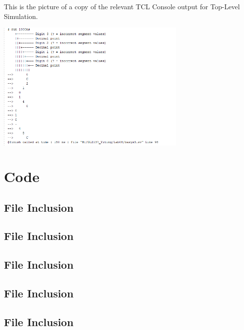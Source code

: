 \documentclass[11pt]{article}
\newcommand{\Verilog}[2][]{%
	
}
\begin{document}
    This is the picture of a copy of the relevant TCL Console output for Top-Level Simulation.
    \begin{center}
        \includegraphics[width=0.7\textwidth]{Top_Level_Simulation}
    \end{center}



\section*{Code}

    \subsection*{File Inclusion}
    \Verilog[caption=mux2 Verilog code,label=code:file_ex]{mux2.sv}

    \subsection*{File Inclusion}
    \Verilog[caption=mux2 Test Benches Verilog code,label=code:file_ex]{mux2_test.sv}


    \subsection*{File Inclusion}
    \Verilog[caption=mux4 Verilog code,label=code:file_ex]{mux4.sv}

    \subsection*{File Inclusion}
    \Verilog[caption=mux4 Test Benches Verilog code,label=code:file_ex]{mux4_test.sv}


    \subsection*{File Inclusion}
    \Verilog[caption=anode decoder Verilog code,label=code:file_ex]{anode_decoder.sv}
\end{document}
